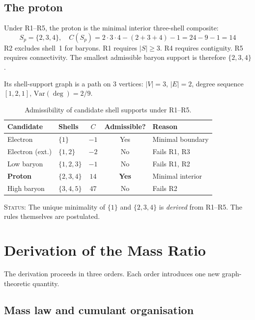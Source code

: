 \documentclass[12pt]{article}
\begin{document}
\subsection{The proton}

Under R1--R5, the proton is the minimal interior three-shell composite:
\[
S_p = \{2, 3, 4\}, \quad C(S_p) = 2 \cdot 3 \cdot 4 - (2+3+4) - 1 = 24 - 9 - 1 = 14
\]
R2 excludes shell~1 for baryons. R1 requires $|S| \geq 3$. R4 requires contiguity. R5 requires connectivity. The smallest admissible baryon support is therefore $\{2, 3, 4\}$.

Its shell-support graph is a path on 3 vertices: $|V| = 3$, $|E| = 2$, degree sequence $[1, 2, 1]$, $\mathrm{Var}(\deg) = 2/9$.

\begin{table}[ht]
\centering
\caption{Admissibility of candidate shell supports under R1--R5.}
\label{tab:candidates}
\begin{tabular}{@{}llccl@{}}
\toprule
Candidate & Shells & $C$ & Admissible? & Reason \\
\midrule
Electron & $\{1\}$ & $-1$ & Yes & Minimal boundary \\
Electron (ext.) & $\{1,2\}$ & $-2$ & No & Fails R1, R3 \\
Low baryon & $\{1,2,3\}$ & $-1$ & No & Fails R1, R2 \\
\textbf{Proton} & $\{2,3,4\}$ & $14$ & \textbf{Yes} & Minimal interior \\
High baryon & $\{3,4,5\}$ & $47$ & No & Fails R2 \\
\bottomrule
\end{tabular}
\end{table}

\textsc{Status:} The unique minimality of $\{1\}$ and $\{2,3,4\}$ is \textit{derived} from R1--R5. The rules themselves are postulated.

\section{Derivation of the Mass Ratio}\label{sec:derivation}

The derivation proceeds in three orders. Each order introduces one new graph-theoretic quantity.

\subsection{Mass law and cumulant organisation}
\end{document}
